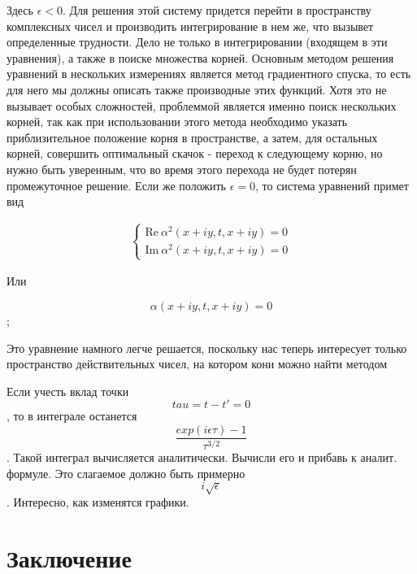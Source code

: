 \documentclass[14pt]{extarticle}
\renewcommand{\Re}{\mathrm{Re}}
\renewcommand{\Im}{\mathrm{Im}}
\renewcommand{\Re}{\mathrm{Re}}
\renewcommand{\Im}{\mathrm{Im}}
\begin{document}
Здесь $\epsilon < 0$. Для решения этой систему придется перейти в пространству комплексных чисел и производить интегрирование в нем же, что вызывет определенные трудности. Дело не только в интегрировании (входящем в эти уравнения), а также в поиске множества корней. Основным методом решения уравнений в нескольких измерениях является метод градиентного спуска, то есть для него мы должны описать также производные этих функций. Хотя это не вызывает особых сложностей, проблеммой является именно поиск нескольких корней, так как при использовании этого метода необходимо указать приблизительное положение корня в пространстве, а затем, для остальных корней, совершить оптимальный скачок - переход к следующему корню, но нужно быть уверенным, что во время этого перехода не будет потерян промежуточное решение.
Если же положить $ \epsilon = 0$, то система уравнений примет вид 

\begin{eqnarray}
\begin{cases}
\Re \ \alpha^2(x+i y, t, x+i y) = 0 \nonumber\\
\Im \ \alpha^2(x+i y, t, x+i y) = 0 \nonumber
\end{cases}
\end{eqnarray}

Или 

\begin{equation}
	\alpha(x+i y, t, x+i y) = 0
\end{equation};

Это уравнение намного легче решается, поскольку нас теперь интересует только пространство действительных чисел, на котором кони можно найти методом 




Если учесть вклад точки $$tau=t-t'=0$$, то в интеграле останется $$\frac{exp(i\epsilon\tau)-1}{\tau^{3/2}}$$.  Такой интеграл вычисляется аналитически.  Вычисли его и прибавь к аналит. формуле.  Это слагаемое должно быть примерно $$i\sqrt{\epsilon}$$.  Интересно, как изменятся графики.

\section*{Заключение}
  

 
\newpage
\end{document}
